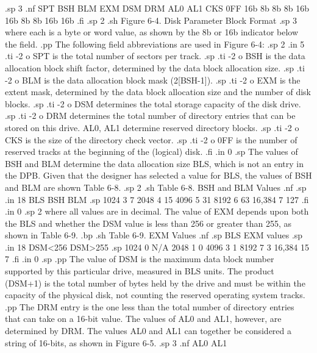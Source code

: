 .sp 3
.nf
    SPT   BSH   BLM   EXM   DSM   DRM   AL0   AL1   CKS   0FF
    16b   8b    8b    8b    16b   16b   8b    8b    16b   16b
.fi
.sp 2
.sh
            Figure 6-4.  Disk Parameter Block Format
.sp 3
where each is a byte or word value, as shown by the 8b or 16b indicator below 
the field.
.pp
The following field abbreviations are used in Figure 6-4:
.sp 2
.in 5
.ti -2
o SPT is the total number of sectors per track.
.sp
.ti -2
o BSH is the data allocation block shift factor, determined by the data
block allocation size.
.sp
.ti -2
o BLM is the data allocation block mask (2[BSH-1]).
.sp
.ti -2
o EXM is the extent mask, determined by the data block allocation 
size and the number of disk blocks.
.sp
.ti -2
o DSM determines the total storage capacity of the disk drive.
.sp
.ti -2
o DRM determines the total number of directory entries that can be 
stored on this drive.  AL0, AL1 determine reserved directory blocks.
.sp
.ti -2
o CKS is the size of the directory check vector.
.sp
.ti -2
o 0FF is the number of reserved tracks at the beginning of the 
(logical) disk.
.fi
.in 0
.sp
The values of BSH and BLM determine the data allocation size BLS, 
which is not an entry in the DPB.  Given that the designer has selected a 
value for BLS, the values of BSH and BLM are shown Table 6-8.
.sp 2
.sh
                 Table 6-8.  BSH and BLM Values
.nf
.sp
.in 18
  BLS         BSH         BLM
.sp
  1024         3            7
  2048         4           15
  4096         5           31
  8192         6           63
16,384         7          127
.fi
.in 0
.sp 2
where all values are in decimal.  The value of EXM depends upon both the BLS 
and whether the DSM value is less than 256 or greater than 255, as shown in 
Table 6-9.
.bp
.sh
                     Table 6-9.  EXM Values
.nf
.sp
                    BLS             EXM values     
.sp                             
.in 18
            DSM<256    DSM>255
.sp
  1024         0         N/A     
  2048         1          0      
  4096         3          1      
  8192         7          3      
16,384        15          7      
.fi
.in 0
.sp
.pp
The value of DSM is the maximum data block number supported by this 
particular drive, measured in BLS units.  The product (DSM+1) is the 
total number of bytes held by the drive and must be within the 
capacity of the physical disk, not counting the reserved operating system 
tracks.
.pp
The DRM entry is the one less than the total number of directory entries 
that can take on a 16-bit value.  The values of AL0 and AL1, however, are 
determined by DRM.  The values AL0 and AL1 can together be considered a 
string of 16-bits, as shown in Figure 6-5.
.sp 3
.nf
                AL0                            AL1

